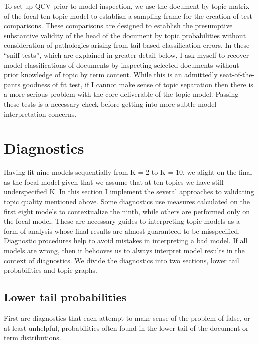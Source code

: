 \documentclass[]{book}
\theoremstyle{definition}
\theoremstyle{definition}
\theoremstyle{definition}
\theoremstyle{remark}
\begin{document}
To set up QCV prior to model inspection, we use the document by topic
matrix of the focal ten topic model to establish a sampling frame for
the creation of test comparisons. These comparisons are designed to
establish the presumptive substantive validity of the head of the
document by topic probabilities without consideration of pathologies
arising from tail-based classification errors. In these ``sniff tests'',
which are explained in greater detail below, I ask myself to recover
model classifications of documents by inspecting selected documents
without prior knowledge of topic by term content. While this is an
admittedly seat-of-the-pants goodness of fit test, if I cannot make
sense of topic separation then there is a more serious problem with the
core deliverable of the topic model. Passing these tests is a necessary
check before getting into more subtle model interpretation concerns.

\hypertarget{diagnostics}{%
\section{Diagnostics}\label{diagnostics}}

Having fit nine models sequentially from K = 2 to K = 10, we alight on
the final as the focal model given that we assume that at ten topics we
have still underspecified K. In this section I implement the several
approaches to validating topic quality mentioned above. Some diagnostics
use measures calculated on the first eight models to contextualize the
ninth, while others are performed only on the focal model. These are
necessary guides to interpreting topic models as a form of analysis
whose final results are almost guaranteed to be misspecified. Diagnostic
procedures help to avoid mistakes in interpreting a bad model. If all
models are wrong, then it behooves us to always interpret model results
in the context of diagnostics. We divide the diagnostics into two
sections, lower tail probabilities and topic graphs.

\hypertarget{lower-tail-probabilities}{%
\subsection{Lower tail probabilities}\label{lower-tail-probabilities}}

First are diagnostics that each attempt to make sense of the problem of
false, or at least unhelpful, probabilities often found in the lower
tail of the document or term distributions.
\end{document}
